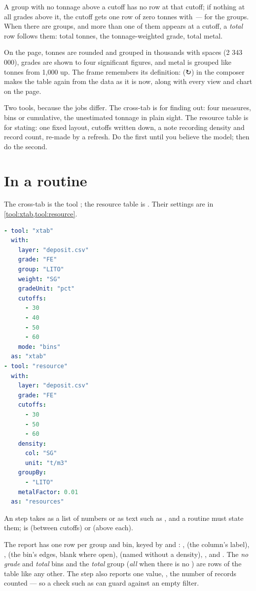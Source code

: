 A group with no tonnage above a cutoff has no row at that cutoff; if nothing at all grades above it, the cutoff gets one row of zero tonnes with \emph{—} for the groups. When there are groups, and more than one of them appears at a cutoff, a \emph{total} row follows them: total tonnes, the tonnage-weighted grade, total metal.

On the page, tonnes are rounded and grouped in thousands with spaces (2 343 000), grades are shown to four significant figures, and metal is grouped like tonnes from 1,000 up. The frame remembers its definition:  (↻) in the composer makes the table again from the data as it is now, along with every view and chart on the page.

\begin{why}
Two tools, because the jobs differ. The cross-tab is for finding out: four measures, bins or cumulative, the unestimated tonnage in plain sight. The resource table is for stating: one fixed layout, cutoffs written down, a note recording density and record count, re-made by a refresh. Do the first until you believe the model; then do the second.
\end{why}

\section{In a routine}\label{sec:resources-routine}
The cross-tab is the tool ; the resource table is . Their settings are in \cref{tool:xtab,tool:resource}.

\begin{lstlisting}[language=yaml]
- tool: "xtab"
  with:
    layer: "deposit.csv"
    grade: "FE"
    group: "LITO"
    weight: "SG"
    gradeUnit: "pct"
    cutoffs:
      - 30
      - 40
      - 50
      - 60
    mode: "bins"
  as: "xtab"
- tool: "resource"
  with:
    layer: "deposit.csv"
    grade: "FE"
    cutoffs:
      - 30
      - 50
      - 60
    density:
      col: "SG"
      unit: "t/m3"
    groupBy:
      - "LITO"
    metalFactor: 0.01
  as: "resources"
\end{lstlisting}

An  step takes  as a list of numbers or as text such as , and a routine must state them;  is  (between cutoffs) or  (above each).

The  report has one row per group and bin, keyed by  and : ,  (the column's label), ,  (the bin's edges, blank where open),  (named  without a density), ,  and . The \emph{no grade} and \emph{total} bins and the \emph{total} group (\emph{all} when there is no ) are rows of the table like any other. The step also reports one value, , the number of records counted — so a check such as  can guard against an empty filter.

